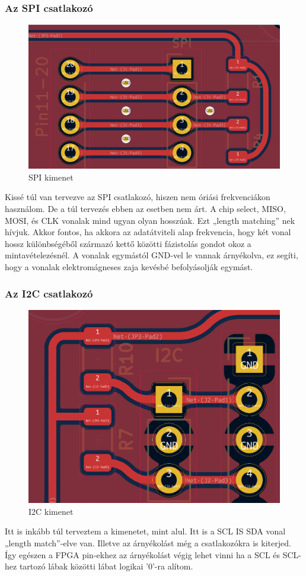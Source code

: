 \documentclass[a4paper,12pt,oneside]{book}
\begin{document}
\subsubsection{Az SPI csatlakozó}
\begin{figure}[H]
	\centering
	\includegraphics[trim=1mm 1mm 1mm 1mm,scale=0.33]{spi kimenet.PNG}
	\caption{SPI kimenet}
	\label{SPI kimenet}
\end{figure}
Kissé túl van tervezve az SPI csatlakozó, hiszen nem óriási frekvenciákon használom. De a túl tervezés ebben az esetben nem árt. A chip select, MISO, MOSI, és CLK vonalak mind ugyan olyan hosszúak. Ezt „length matching” nek hívjuk. Akkor fontos, ha akkora az adatátviteli alap frekvencia, hogy két vonal hossz különbségéből származó kettő közötti fázistolás gondot okoz a mintavételezésnél. A vonalak egymástól GND-vel le vannak árnyékolva, ez segíti, hogy a vonalak elektromágneses zaja kevésbé befolyásolják egymást.
\subsubsection{Az I2C csatlakozó}
\begin{figure}[H]
	\centering
	\includegraphics[trim=1mm 1mm 1mm 1mm,scale=0.45]{i2ckimenet.PNG}
	\caption{I2C kimenet}
	\label{I2C kimenet}
\end{figure}
Itt is inkább túl terveztem a kimenetet, mint alul. Itt is a SCL IS SDA vonal „length match”-elve van. Illetve az árnyékolást még a csatlakozókra is kiterjed. Így egészen a FPGA pin-ekhez az árnyékolást végig lehet vinni ha a SCL és SCL-hez tartozó lábak közötti lábat logikai ’0’-ra alítom.
\end{document}
